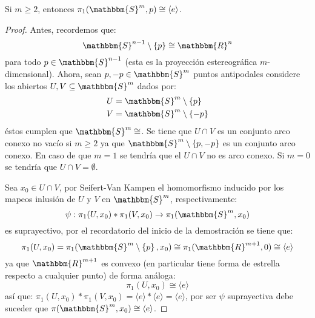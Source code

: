\documentclass[12pt]{report}
\newcounter{it}
\theoremstyle{largebreak}
\newcommand\cf[3]{\ensuremath{#1:#2\rightarrow#3}}
\newcommand{\bbm}[1]{\ensuremath{\mathbbm{#1}}}
\newcommand{\gen}[1]{\ensuremath{\langle#1\rangle}}
\begin{document}
    \begin{excer}
        Si $m\geq 2$, entonces $\pi_1(\bbm{S}^m,p)\cong\gen{e}$.
    \end{excer}

    \begin{proof}
        Antes, recordemos que:
        \begin{equation*}
            \bbm{S}^{n-1}\setminus\left\{p\right\}\cong\bbm{R}^n
        \end{equation*}
        para todo $p\in\bbm{S}^{n-1}$ (esta es la proyección estereográfica $m$-dimensional). Ahora, sean $p,-p\in\bbm{S}^{m}$ puntos antipodales considere los abiertos $U,V\subseteq\bbm{S}^{m}$ dados por:
        \begin{equation*}
            \begin{split}
                U&=\bbm{S}^{ m}\setminus\left\{p\right\}\\
                V&=\bbm{S}^{ m}\setminus\left\{-p\right\}
            \end{split}
        \end{equation*}
        éstos cumplen que $\bbm{S}^{m}\cong$. Se tiene que $U\cap V$ es un conjunto arco conexo no vacío si $m\geq2$ ya que $\bbm{S}^{ m}\setminus\left\{p,-p\right\}$ es un conjunto arco conexo. En caso de que $m=1$ se tendría que el $U\cap V$ no es arco conexo. Si $m=0$ se tendría que $U\cap V=\emptyset$.
        
        Sea $x_0\in U\cap V$, por Seifert-Van Kampen el homomorfismo inducido por los mapeos inlusión de $U$ y $V$ en $\bbm{S}^{m}$, respectivamente:
        \begin{equation*}
            \cf{\psi}{\pi_1(U,x_0)*\pi_1(V,x_0)}{\pi_1(\bbm{S}^{m},x_0)}
        \end{equation*}
        es suprayectivo, por el recordatorio del inicio de la demostración se tiene que:
        \begin{equation*}
            \pi_1(U,x_0)=\pi_1(\bbm{S}^{ m}\setminus\left\{p\right\},x_0)\cong\pi_1(\bbm{R}^{ m+1},0)\cong\gen{e}
        \end{equation*}
        ya que $\bbm{R}^{m+1}$ es convexo (en particular tiene forma de estrella respecto a cualquier punto) de forma análoga:
        \begin{equation*}
            \pi_1(U,x_0)\cong\gen{e}
        \end{equation*}
        así que: $\pi_1(U,x_0)*\pi_1(V,x_0)=\gen{e}*\gen{e}=\gen{e}$, por ser $\psi$ suprayectiva debe suceder que $\pi(\bbm{S}^{m},x_0)\cong\gen{e}$.
    \end{proof}
\end{document}
